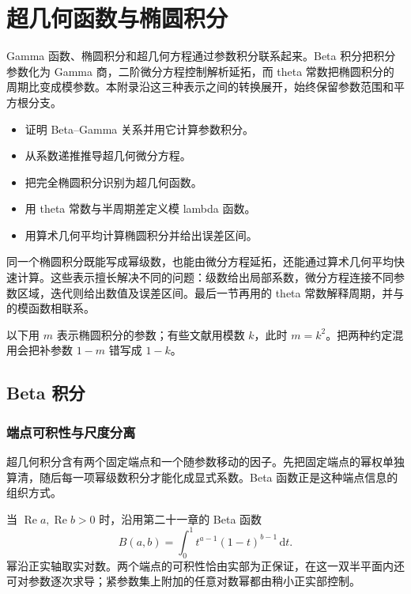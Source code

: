 \chapter{超几何函数与椭圆积分}
\label{b3:app:F}
\begin{chapterabstract}
Gamma 函数、椭圆积分和超几何方程通过参数积分联系起来。Beta 积分把积分参数化为 Gamma 商，二阶微分方程控制解析延拓，而 theta 常数把椭圆积分的周期比变成模参数。本附录沿这三种表示之间的转换展开，始终保留参数范围和平方根分支。
\end{chapterabstract}
\begin{learninggoals}
\begin{itemize}
\item\label{b3:item:F-goal-1}证明 Beta--Gamma 关系并用它计算参数积分。
\item\label{b3:item:F-goal-2}从系数递推推导超几何微分方程。
\item\label{b3:item:F-goal-3}把完全椭圆积分识别为超几何函数。
\item\label{b3:item:F-goal-4}用 theta 常数与半周期差定义模 lambda 函数。
\item\label{b3:item:F-goal-5}用算术几何平均计算椭圆积分并给出误差区间。
\end{itemize}
\end{learninggoals}
同一个椭圆积分既能写成幂级数，也能由微分方程延拓，还能通过算术几何平均快速计算。这些表示擅长解决不同的问题：级数给出局部系数，微分方程连接不同参数区域，迭代则给出数值及误差区间。最后一节再用的 theta 常数解释周期，并与的模函数相联系。

以下用 \(m\) 表示椭圆积分的参数；有些文献用模数 \(k\)，此时 \(m=k^2\)。把两种约定混用会把补参数 \(1-m\) 错写成 \(1-k\)。

\section{Beta 积分}
\label{b3:sec:F01}

\subsection{端点可积性与尺度分离}
\label{b3:subsec:F0101}

超几何积分含有两个固定端点和一个随参数移动的因子。先把固定端点的幂权单独算清，随后每一项幂级数积分才能化成显式系数。Beta 函数正是这种端点信息的组织方式。

当 \(\operatorname{Re}a,\operatorname{Re}b>0\) 时，沿用第二十一章的 Beta 函数
\[
 B(a,b)=\int_0^1t^{a-1}(1-t)^{b-1}\,\mathrm{d}t.
\]
幂沿正实轴取实对数。两个端点的可积性恰由实部为正保证，在这一双半平面内还可对参数逐次求导；紧参数集上附加的任意对数幂都由稍小正实部控制。

